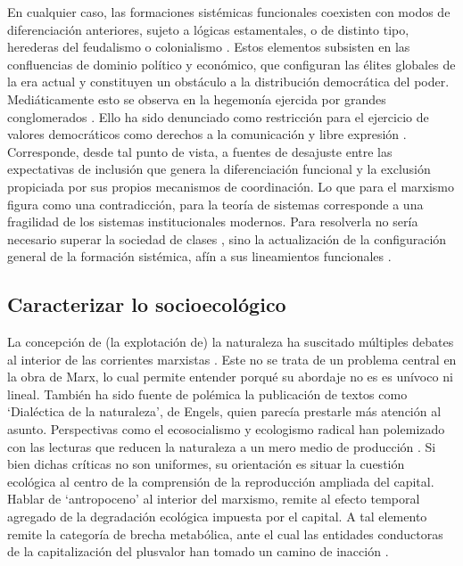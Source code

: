 \documentclass{textolivre}
\begin{document}
En cualquier caso, las formaciones sistémicas funcionales coexisten con modos de
diferenciación anteriores, sujeto a lógicas estamentales, o de distinto tipo, herederas del
feudalismo o colonialismo \cite{Mascareo2018}. Estos elementos subsisten en las
confluencias de dominio político y económico, que configuran las élites globales de la era
actual y constituyen un obstáculo a la distribución democrática del poder. Mediáticamente
esto se observa en la hegemonía ejercida por grandes conglomerados \cite{mosco2016}. 
Ello ha sido denunciado como restricción para el ejercicio de valores democráticos
como derechos a la comunicación y libre expresión \cite{Santander2014,sapiezynska2013}.
Corresponde, desde tal punto de vista, a fuentes de desajuste
entre las expectativas de inclusión que genera la diferenciación funcional y la exclusión
propiciada por sus propios mecanismos de coordinación. Lo que para el marxismo figura
como una contradicción, para la teoría de sistemas corresponde a una fragilidad de los
sistemas institucionales modernos. Para resolverla no sería necesario superar la sociedad
de clases \cite{lenin1997}, sino la actualización de la configuración general de la formación
sistémica, afín a sus lineamientos funcionales \cite{Luhmann2007,Tkke2010}.



\subsection{Caracterizar lo socioecológico}\label{sec-caracterizar}

La concepción de (la explotación de) la naturaleza ha suscitado múltiples debates
al interior de las corrientes marxistas \cite{arboleda}. Este no se trata de un
problema central en la obra de Marx, lo cual permite entender porqué su abordaje no es
es unívoco ni lineal. También ha sido fuente de polémica la publicación de textos como
‘Dialéctica de la naturaleza’, de Engels, quien parecía prestarle más atención al asunto.
Perspectivas como el ecosocialismo y ecologismo radical han polemizado con las lecturas
que reducen la naturaleza a un mero medio de producción \cite{Foster2016}. Si bien
dichas críticas no son uniformes, su orientación es situar la cuestión ecológica al centro
de la comprensión de la reproducción ampliada del capital. Hablar de ‘antropoceno’ al
interior del marxismo, remite al efecto temporal agregado de la degradación ecológica
impuesta por el capital. A tal elemento remite la categoría de brecha metabólica, ante el
cual las entidades conductoras de la capitalización del plusvalor han tomado un camino
de inacción \cite{Gunderson2019}.
\end{document}

